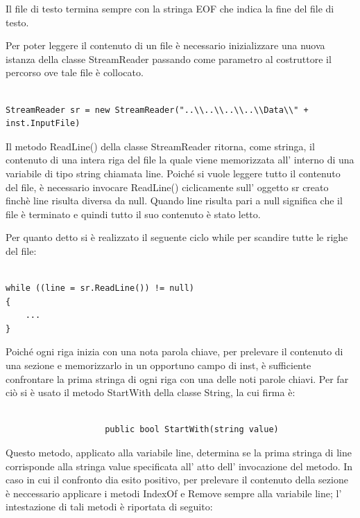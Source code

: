 \documentclass[11pt]{article}
\begin{document}
Il file di testo termina sempre con la stringa EOF che indica la fine del file di testo.

Per poter leggere il contenuto di un file \`e necessario inizializzare una nuova istanza della classe StreamReader passando come parametro al costruttore il percorso ove tale file \`e  collocato.


\begin{lstlisting}

StreamReader sr = new StreamReader("..\\..\\..\\..\\Data\\" + inst.InputFile)

\end{lstlisting}


Il metodo ReadLine() della classe StreamReader ritorna, come stringa, il contenuto di una intera riga del file la quale viene memorizzata all' interno di una variabile di tipo string chiamata line. Poich\'e si vuole leggere tutto il contenuto del file, \`e necessario invocare ReadLine() ciclicamente sull' oggetto sr creato finch\`e line risulta diversa da null. Quando line risulta pari a null significa che il file \`e terminato e quindi tutto il suo contenuto \`e stato letto.

Per quanto detto si \`e realizzato il seguente ciclo while per scandire tutte le righe del file:

\begin{lstlisting}

while ((line = sr.ReadLine()) != null)
{
	...
}
\end{lstlisting}


Poich\'e ogni riga inizia con una nota parola chiave, per prelevare il contenuto di una sezione e memorizzarlo in un opportuno campo di inst, \`e sufficiente confrontare la prima stringa di ogni riga con una delle noti parole chiavi. Per far ci\`o si \`e  usato il metodo StartWith della classe String, la cui firma \`e:

\begin{lstlisting}

                    public bool StartWith(string value)

\end{lstlisting}

Questo metodo, applicato alla variabile line, determina se la prima stringa di line corrisponde alla stringa value specificata all' atto dell' invocazione del metodo. In caso in cui il confronto dia esito positivo, per prelevare il contenuto della sezione \`e neccessario applicare i metodi IndexOf e Remove sempre alla variabile line; l' intestazione di tali metodi \`e riportata di seguito:
\end{document}
